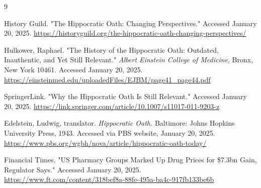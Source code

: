 \documentclass[12pt]{article}
\begin{document}
\bigskip

\newpage
\begin{thebibliography}{9}

History Guild. "The Hippocratic Oath: Changing Perspectives." Accessed January 20, 2025.  
\url{https://historyguild.org/the-hippocratic-oath-changing-perspectives/}

Hulkower, Raphael. "The History of the Hippocratic Oath: Outdated, Inauthentic, and Yet Still Relevant." \textit{Albert Einstein College of Medicine}, Bronx, New York 10461. Accessed January 20, 2025.  
\url{https://einsteinmed.edu/uploadedFiles/EJBM/page41_page44.pdf}

SpringerLink. "Why the Hippocratic Oath Is Still Relevant." Accessed January 20, 2025.  
\url{https://link.springer.com/article/10.1007/s11017-011-9203-z}

Edelstein, Ludwig, translator. \textit{Hippocratic Oath.} Baltimore: Johns Hopkins University Press, 1943. Accessed via PBS website, January 20, 2025.  
\url{https://www.pbs.org/wgbh/nova/article/hippocratic-oath-today/}

Financial Times. "US Pharmacy Groups Marked Up Drug Prices for \$7.3bn Gain, Regulator Says." Accessed January 20, 2025.  
\url{https://www.ft.com/content/318bef8a-88fe-495a-ba4c-917fb133be6b}

\end{thebibliography}
\end{document}
